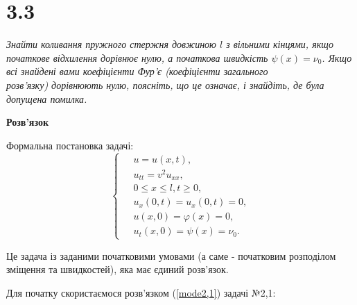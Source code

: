 

%



\section[Задача №3.3]{3.3}

\textit{Знайти коливання пружного стержня довжиною $l$ з вільними кінцями, якщо початкове відхилення дорівнює нулю, а початкова швидкість $\psi(x) = \nu_0$. Якщо всі знайдені вами коефіцієнти Фур'є (коефіцієнти загального\\ розв’язку) дорівнюють нулю, поясніть, що це означає, і знайдіть, де була допущена помилка.}

\begin{center}
    \textbf{Розв'язок}
\end{center}
Формальна постановка задачі:
\begin{equation} \label{cond3,3}
    \left\{ \begin{aligned} 
        &\;u = u(x,t), \\
        &\;u_{tt} = v^2 u_{xx}, \\
        &\;0 \leq x \leq l, t \geq 0, \\
        &\;u_x(0,t) = u_x(0,t) = 0,\\
        &\;u(x,0) = \varphi(x) = 0, \\ 
        &\;u_t(x,0) = \psi(x) = \nu_0.
    \end{aligned} \right.
\end{equation}

Це задача із заданими початковими умовами (а саме - початковим розподілом зміщення та швидкостей), яка має єдиний розв'язок.

Для початку скористаємося розв'язком (\ref{mode2,1}) задачі №2,1:

